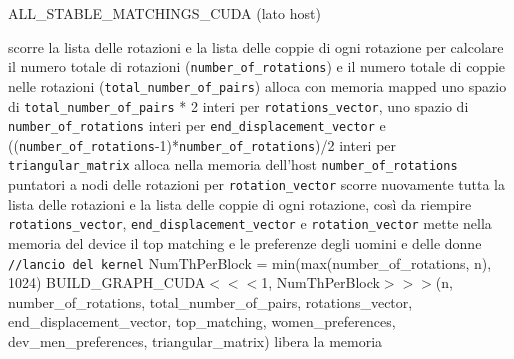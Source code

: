 \documentclass[12pt]{article}
\begin{document}
    
    \begin{algorithm}[H]
        \scriptsize
        \DontPrintSemicolon
        \caption{ALL\_STABLE\_MATCHINGS\_CUDA (lato host)}\label{alg:AllStableMatchingsCUDA}
        \;
        [...]\;
        \;
        scorre la lista delle rotazioni e la lista delle coppie di ogni rotazione per calcolare il numero totale di rotazioni (\texttt{number\_of\_rotations}) e il numero totale di coppie nelle rotazioni (\texttt{total\_number\_of\_pairs})\;
        \;
        alloca con memoria mapped uno spazio di \texttt{total\_number\_of\_pairs} * 2 interi per \texttt{rotations\_vector}, uno spazio di \texttt{number\_of\_rotations} interi per \texttt{end\_displacement\_vector} e ((\texttt{number\_of\_rotations}-1)*\texttt{number\_of\_rotations})/2 interi per \texttt{triangular\_matrix}\;
        \;
        alloca nella memoria dell'host \texttt{number\_of\_rotations} puntatori a nodi delle rotazioni per \texttt{rotation\_vector}\;
        \;
        scorre nuovamente tutta la lista delle rotazioni e la lista delle coppie di ogni rotazione, così da riempire \texttt{rotations\_vector}, \texttt{end\_displacement\_vector} e \texttt{rotation\_vector}\;
        \;
        mette nella memoria del device il top matching e le preferenze degli uomini e delle donne\;
        \;
        \texttt{//lancio del kernel}\;
        NumThPerBlock = min(max(number\_of\_rotations, n), 1024)\;
        BUILD\_GRAPH\_CUDA$<<<$1, NumThPerBlock$>>>$(n, number\_of\_rotations, total\_number\_of\_pairs, rotations\_vector, end\_displacement\_vector, top\_matching, women\_preferences, dev\_men\_preferences, triangular\_matrix)\;
        \;
        \;
        libera la memoria\;
        \;
        [...]\;
        \;
    \end{algorithm}
\end{document}
